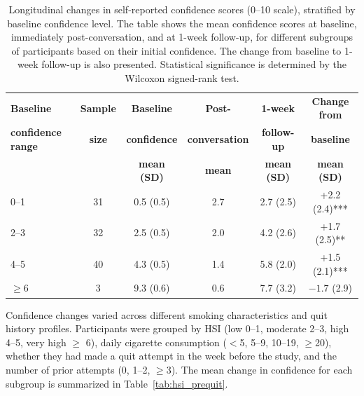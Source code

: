 \begin{table}[ht!]
  \centering
  \small
  \renewcommand{\arraystretch}{1.1}
  \begin{tabular*}{\linewidth}{@{\extracolsep{\fill}}lccccc@{}}
    \toprule
    \textbf{Baseline} & \textbf{Sample} & \textbf{Baseline} & \textbf{Post-} & \textbf{1-week} & \textbf{Change from} \\
    \textbf{confidence range} & \textbf{size} & \textbf{confidence} & \textbf{conversation} & \textbf{follow-up} & \textbf{baseline} \\
    & & \textbf{mean (SD)} & \textbf{mean} & \textbf{mean (SD)} & \textbf{mean (SD)} \\
    \midrule
    0--1   & 31 & 0.5 (0.5) & 2.7 & 2.7 (2.5) & +2.2 (2.4)*** \\
    2--3   & 32 & 2.5 (0.5) & 2.0 & 4.2 (2.6) & +1.7 (2.5)** \\
    4--5   & 40 & 4.3 (0.5) & 1.4 & 5.8 (2.0) & +1.5 (2.1)*** \\
    $\geq$6 & 3 & 9.3 (0.6) & 0.6 & 7.7 (3.2) & $-1.7$ (2.9) \\
    \bottomrule
  \end{tabular*}
  \caption[Confidence Changes by Baseline Confidence]{Longitudinal changes in self-reported confidence scores (0--10 scale), stratified by baseline confidence level. The table shows the mean confidence scores at baseline, immediately post-conversation, and at 1-week follow-up, for different subgroups of participants based on their initial confidence. The change from baseline to 1-week follow-up is also presented. Statistical significance is determined by the Wilcoxon signed-rank test.}
  \label{tab:baseline_confidence}
\end{table}




Confidence changes varied across different smoking characteristics and quit history profiles. Participants were grouped by HSI (low 0--1, moderate 2--3, high 4--5, very high $\geq$ 6), daily cigarette consumption ($<$5, 5--9, 10--19, $\geq$20), whether they had made a quit attempt in the week before the study, and the number of prior attempts (0, 1--2, $\geq$3). The mean change in confidence for each subgroup is summarized in Table~\ref{tab:hsi_prequit}.

